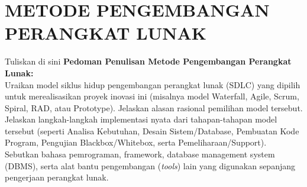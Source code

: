 \chapter{METODE PENGEMBANGAN PERANGKAT LUNAK}


Tuliskan di sini \textbf{Pedoman Penulisan Metode Pengembangan Perangkat Lunak:} \\
Uraikan model siklus hidup pengembangan perangkat lunak (SDLC) yang dipilih untuk merealisasikan proyek inovasi ini (misalnya model Waterfall, Agile, Scrum, Spiral, RAD, atau Prototype). Jelaskan alasan rasional pemilihan model tersebut.\\
Jelaskan langkah-langkah implementasi nyata dari tahapan-tahapan model tersebut (seperti Analisa Kebutuhan, Desain Sistem/Database, Pembuatan Kode Program, Pengujian Blackbox/Whitebox, serta Pemeliharaan/Support).\\
Sebutkan bahasa pemrograman, framework, database management system (DBMS), serta alat bantu pengembangan (\textit{tools}) lain yang digunakan sepanjang pengerjaan perangkat lunak.

